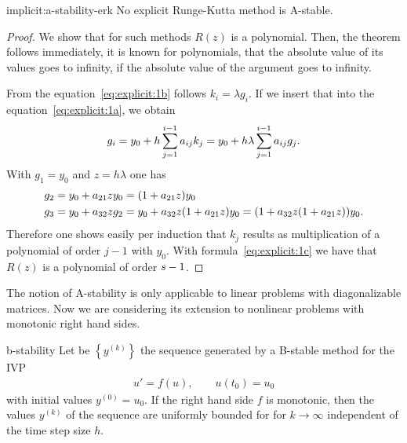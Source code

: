 \begin{Theorem}{implicit:a-stability-erk}
  No explicit Runge-Kutta method is A-stable.
\end{Theorem}

\begin{proof}
  We show that for such methods $R(z)$ is a polynomial.  Then, the
  theorem follows immediately, it is known for polynomials, that the
  absolute value of its values goes to infinity, if the absolute value
  of the argument goes to infinity.
  
  From the equation~\eqref{eq:explicit:1b} follows $k_i = \lambda
  g_i$. If we insert that into the equation~\eqref{eq:explicit:1a},
  we obtain
  \begin{gather*}
    g_i = y_0 + h \sum_{j=1}^{i-1} a_{ij}k_j = y_0 + h\lambda
    \sum_{j=1}^{i-1} a_{ij} g_j.
  \end{gather*}
  With $g_1 = y_0$ and $z=h\lambda$ one has
  \begin{align*}
    g_2 &= y_0+ a_{21} z y_0 = (1+a_{21}z) y_0\\
    g_3 &= y_0 +  a_{32} z g_2 =  y_0 +  a_{32} z (1+a_{21} z) y_0 =
    (1+a_{32} z(1+a_{21} z)) y_0.
  \end{align*}
	Therefore one shows easily per induction that $k_j$ results as
	multiplication of a polynomial of order $j-1$ with $y_0$. 
  With formula~\eqref{eq:explicit:1c} we have that $R(z)$ is a
  polynomial of order $s-1$.
\end{proof}



\begin{remark}
  The notion of A-stability is only applicable to linear problems with
  diagonalizable matrices. Now we are considering its extension to
  nonlinear problems with monotonic right hand sides.
\end{remark}



\begin{Theorem}{b-stability}
  Let be $\left\{y^{(k)}\right\}$ the sequence generated by a
  B-stable method for the IVP
  \begin{gather*}
    u'=f(u), \qquad u(t_0) = u_0
  \end{gather*}
  with initial values $y^{(0)} = u_0$. If the right hand side $f$ is
  monotonic, then the values $y^{(k)}$ of the sequence are uniformly
  bounded for for $k\to\infty$ independent of the time step size $h$.
\end{Theorem}


